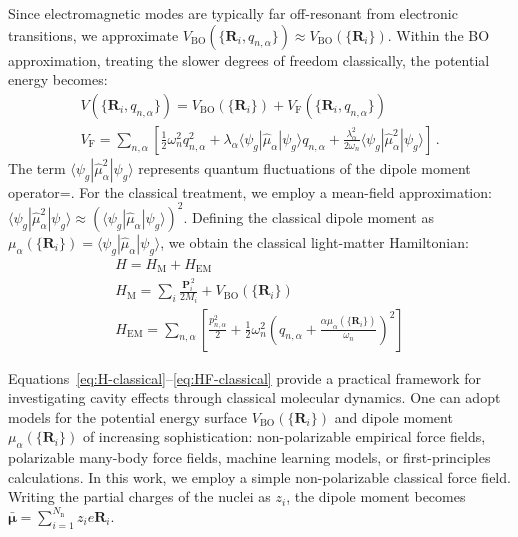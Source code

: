 \documentclass[%
 reprint,
 amsmath,amssymb,
 aps,
]{revtex4-2}
\begin{document}
Since electromagnetic modes are typically far off-resonant from electronic transitions, we approximate $V_\mathrm{BO}(\{ \bm{R}_i,q_{n,\alpha} \}) \approx V_\mathrm{BO}(\{ \bm{R}_i\})$.
Within the BO approximation, treating the slower degrees of freedom classically, the potential energy becomes:
\begin{gather}
V(\{ \bm{R}_i,q_{n,\alpha} \}) = V_\mathrm{BO}(\{ \bm{R}_i \}) + V_\mathrm{F}(\{\bm{R}_i, q_{n,\alpha}\}) \\
V_\mathrm{F} = \sum_{n,\alpha} \left[ \frac{1}{2} \omega_n^2 q_{n,\alpha}^2 +\lambda_\alpha \langle \psi_g |\hat{\mu}_\alpha |\psi_g \rangle q_{n,\alpha}+\frac{\lambda_\alpha^2}{2 \omega_n} \langle \psi_g | \hat{\mu}_\alpha^2 |\psi_g \rangle \right] \,.
\end{gather}
The term $\langle \psi_g | \hat{\mu}_\alpha^2 |\psi_g \rangle$ represents quantum fluctuations of the dipole moment operator=.
For the classical treatment, we employ a mean-field approximation: $\langle \psi_g | \hat{\mu}_\alpha^2 |\psi_g \rangle \approx \left(\langle \psi_g | \hat{\mu}_\alpha |\psi_g \rangle \right)^2$.
Defining the classical dipole moment as $\mu_\alpha(\{\bm{R}_i\}) = \langle \psi_g | \hat{\mu}_\alpha |\psi_g \rangle$, we obtain the classical light-matter Hamiltonian:
\begin{gather}
H  = H_\mathrm{M}+H_\mathrm{EM} \label{eq:H-classical}
\\
H_\mathrm{M} = \sum_i \frac{\bm{P}_i^{\,2}}{2M_i} + V_\mathrm{BO}(\{ \bm{R}_i \}) \label{eq:HM-classical}
\\
H_\mathrm{EM} = \sum_{n,\alpha} \left[ \frac{p_{n,\alpha}^2}{2}+ \frac{1}{2} \omega_n^2 \left(q_{n,\alpha} +\frac{\alpha \mu_\alpha(\{ \bm{R}_i \})}{\omega_n} \right)^2 \right] \label{eq:HF-classical}
\end{gather}

Equations~\eqref{eq:H-classical}--\eqref{eq:HF-classical} provide a practical framework for investigating cavity effects through classical molecular dynamics.
One can adopt models for the potential energy surface $V_\mathrm{BO}(\{ \bm{R}_i\})$ and dipole moment $\mu_\alpha(\{\bm{R}_i\})$ of increasing sophistication: non-polarizable empirical force fields, polarizable many-body force fields, machine learning models, or first-principles calculations.
In this work, we employ a simple non-polarizable classical force field.
Writing the partial charges of the nuclei as $z_i$, the dipole moment becomes $\bar{\bm \mu} = \sum_{i=1}^{N_\mathrm{n}} z_ie \bm{R}_i$.
\end{document}
